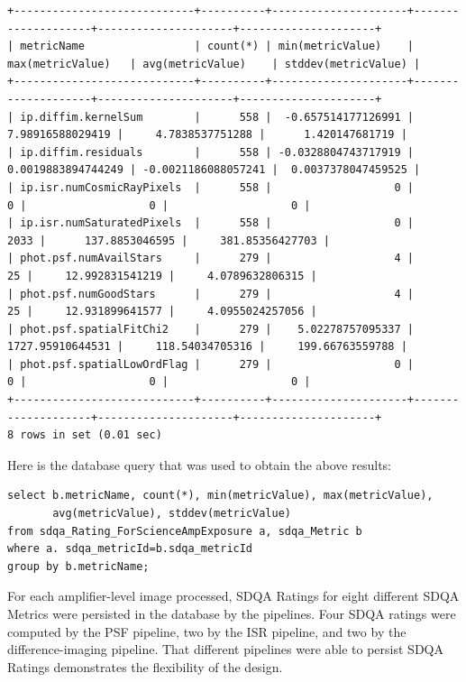 {\tiny
\begin{verbatim}
+----------------------------+----------+---------------------+--------------------+---------------------+---------------------+
| metricName                 | count(*) | min(metricValue)    | max(metricValue)   | avg(metricValue)    | stddev(metricValue) |
+----------------------------+----------+---------------------+--------------------+---------------------+---------------------+
| ip.diffim.kernelSum        |      558 |  -0.657514177126991 |   7.98916588029419 |     4.7838537751288 |      1.420147681719 | 
| ip.diffim.residuals        |      558 | -0.0328804743717919 | 0.0019883894744249 | -0.0021186088057241 |  0.0037378047459525 | 
| ip.isr.numCosmicRayPixels  |      558 |                   0 |                  0 |                   0 |                   0 | 
| ip.isr.numSaturatedPixels  |      558 |                   0 |               2033 |      137.8853046595 |     381.85356427703 | 
| phot.psf.numAvailStars     |      279 |                   4 |                 25 |     12.992831541219 |     4.0789632806315 | 
| phot.psf.numGoodStars      |      279 |                   4 |                 25 |     12.931899641577 |     4.0955024257056 | 
| phot.psf.spatialFitChi2    |      279 |    5.02278757095337 |   1727.95910644531 |     118.54034705316 |     199.66763559788 | 
| phot.psf.spatialLowOrdFlag |      279 |                   0 |                  0 |                   0 |                   0 | 
+----------------------------+----------+---------------------+--------------------+---------------------+---------------------+
8 rows in set (0.01 sec)
\end{verbatim}
}

\noindent
Here is the database query that was used to obtain the above results:

{\small
\begin{verbatim}
select b.metricName, count(*), min(metricValue), max(metricValue),
       avg(metricValue), stddev(metricValue) 
from sdqa_Rating_ForScienceAmpExposure a, sdqa_Metric b 
where a. sdqa_metricId=b.sdqa_metricId 
group by b.metricName;
\end{verbatim}
}

For each amplifier-level image processed, SDQA Ratings for eight different SDQA Metrics 
were persisted in the database by the pipelines.  Four SDQA ratings were computed by
the PSF pipeline, two by the ISR pipeline, and two by the difference-imaging pipeline.
That different pipelines were able to persist SDQA Ratings demonstrates the flexibility of the design.

